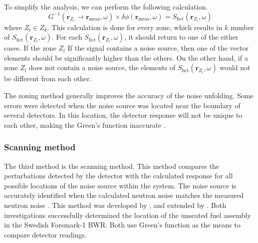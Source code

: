 To simplify the analysis, we can perform the following calculation.
\begin{equation}
    G^{-1}(\textbf{r}_{Z_l} \rightarrow \textbf{r}_{\text{meas}}, \omega) \times \delta \phi (\textbf{r}_{\text{meas}},\omega) = S_{\text{fict}}(\textbf{r}_{Z_l}, \omega)
    \label{eq:zoning_simple}
\end{equation}
where $Z_l \in Z_k$. This calculation is done for every zone, which results in $k$ number of $S_{\text{fict}}(\textbf{r}_{Z_l}, \omega)$. For each $S_{\text{fict}}(\textbf{r}_{Z_l}, \omega)$, it should return to one of the either cases. If the zone $Z_l$ If the signal contains a noise source, then one of the vector elements should be significantly higher than the others. On the other hand, if a zone $Z_l$ does not contain a noise source, the elements of $S_{\text{fict}}(\textbf{r}_{Z_l}, \omega)$ would not be different from each other.

The zoning method generally improves the accuracy of the noise unfolding. Some errors were detected when the noise source was located near the boundary of several detectors. In this location, the detector response will not be unique to each other, making the Green’s function inaccurate \cite{demaziereIdentificationLocalizationAbsorbers2005}.

\subsubsection{Scanning method}

The third method is the scanning method. This method compares the perturbations detected by the detector with the calculated response for all possible locations of the noise source within the system. The noise source is accurately identified when the calculated neutron noise matches the measured neutron noise \cite{demaziereIdentificationLocalizationAbsorbers2005}. This method was developed by \cite{karlssonLocalizationChannelInstability1999}, and extended by \cite{demaziereDevelopmentNoisebasedMethod2002}. Both investigations successfully determined the location of the unseated fuel assembly in the Swedish Forsmark-1 BWR. Both use Green’s function as the means to compare detector readings.

